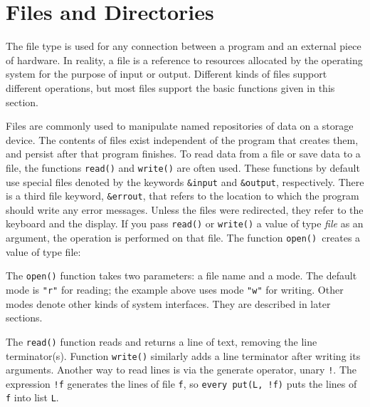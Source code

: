 \section{Files and Directories}

The file type is used for any connection between a program and an
external piece of hardware. In reality, a file is a
reference to resources allocated by the
operating system for the purpose of input or output. Different kinds
of files support different operations, but most files support the
basic functions given in this section.

Files are commonly used to manipulate named repositories of data on a
storage device. The contents of files exist independent of the program
that creates them, and persist after that program finishes.  To read
data from a file or save data to a file, the functions
\texttt{read()} and \texttt{write()} are
often used. These functions by default use special files denoted by
the keywords \texttt{\&input} and
\texttt{\&output},
respectively. There is a third file keyword, \texttt{\&errout}, that refers to the location to which the
program should write any error messages.  Unless the files were
redirected, they refer to the keyboard and the
display. If you pass \texttt{read()} or
\texttt{write()} a value of type \textit{file} as an argument, the
operation is performed on that file. The function
\texttt{open()}\texttt{ }creates a value of type file:


\noindent
The \texttt{open()} function takes two parameters: a file
name and a mode. The default mode is
\texttt{"r"} for reading; the example above
uses mode \texttt{"w"} for
writing. Other modes denote other kinds of system interfaces.
They are described in later sections.

The \texttt{read()} function reads and returns a line of text, removing the
line terminator(s). Function \texttt{write()}
similarly adds a line terminator after writing its arguments.
Another way to read lines is via the generate operator, unary
\texttt{!}. The expression \texttt{!f} generates the lines of file
\texttt{f}, so \texttt{every put(L, !f)} puts the lines of
\texttt{f} into list \texttt{L}.


